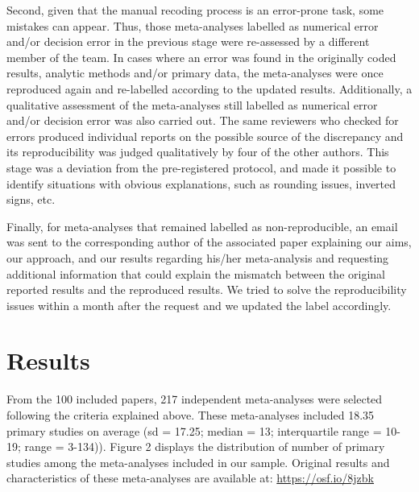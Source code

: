 \documentclass[
  ,apa7,floatsintext]{apa6}
\begin{document}
Second, given that the manual recoding process is an error-prone task, some mistakes can appear. Thus, those meta-analyses labelled as numerical error and/or decision error in the previous stage were re-assessed by a different member of the team. In cases where an error was found in the originally coded results, analytic methods and/or primary data, the meta-analyses were once reproduced again and re-labelled according to the updated results. Additionally, a qualitative assessment of the meta-analyses still labelled as numerical error and/or decision error was also carried out. The same reviewers who checked for errors produced individual reports on the possible source of the discrepancy and its reproducibility was judged qualitatively by four of the other authors. This stage was a deviation from the pre-registered protocol, and made it possible to identify situations with obvious explanations, such as rounding issues, inverted signs, etc.

Finally, for meta-analyses that remained labelled as non-reproducible, an email was sent to the corresponding author of the associated paper explaining our aims, our approach, and our results regarding his/her meta-analysis and requesting additional information that could explain the mismatch between the original reported results and the reproduced results. We tried to solve the reproducibility issues within a month after the request and we updated the label accordingly.

\hypertarget{results}{%
\section{Results}\label{results}}

From the 100 included papers, 217 independent meta-analyses were selected following the criteria explained above. These meta-analyses included 18.35 primary studies on average (sd = 17.25; median = 13; interquartile range = 10-19; range = 3-134)). Figure 2 displays the distribution of number of primary studies among the meta-analyses included in our sample. Original results and characteristics of these meta-analyses are available at: \url{https://osf.io/8jzbk}
\end{document}
